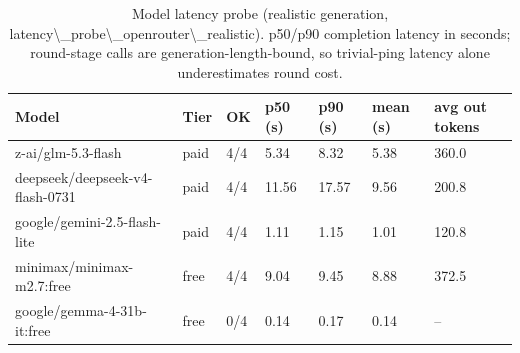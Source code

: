 \begin{table}[H]
\centering\small
\caption{Model latency probe (realistic generation, latency\textbackslash{}\_probe\textbackslash{}\_openrouter\textbackslash{}\_realistic). p50/p90 completion latency in seconds; round-stage calls are generation-length-bound, so trivial-ping latency alone underestimates round cost.}
\label{tab:latency-latency-probe-openrouter-realistic}
\begin{tabular}{lllllll}
\toprule
Model & Tier & OK & p50 (s) & p90 (s) & mean (s) & avg out tokens \\
\midrule
z-ai/glm-5.3-flash & paid & 4/4 & 5.34 & 8.32 & 5.38 & 360.0 \\
deepseek/deepseek-v4-flash-0731 & paid & 4/4 & 11.56 & 17.57 & 9.56 & 200.8 \\
google/gemini-2.5-flash-lite & paid & 4/4 & 1.11 & 1.15 & 1.01 & 120.8 \\
minimax/minimax-m2.7:free & free & 4/4 & 9.04 & 9.45 & 8.88 & 372.5 \\
google/gemma-4-31b-it:free & free & 0/4 & 0.14 & 0.17 & 0.14 & -- \\
\bottomrule
\end{tabular}
\end{table}
